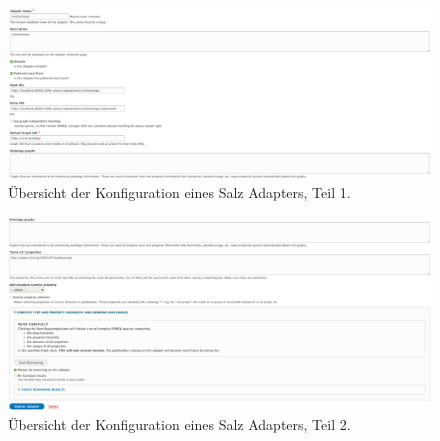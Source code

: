 \begin{figure}
    \includegraphics[width=1.0\textwidth,height=0.4\textwidth]{Figures/berndl/adapter1}
    \caption{\label{fig:adapter1} Übersicht der Konfiguration eines \wisski Salz Adapters, Teil 1.}
\end{figure}

\begin{figure}
    \includegraphics[width=1.0\textwidth,height=0.4\textwidth]{Figures/berndl/adapter3}
    \caption{\label{fig:adapter2} Übersicht der Konfiguration eines \wisski Salz Adapters, Teil 2.}
\end{figure}